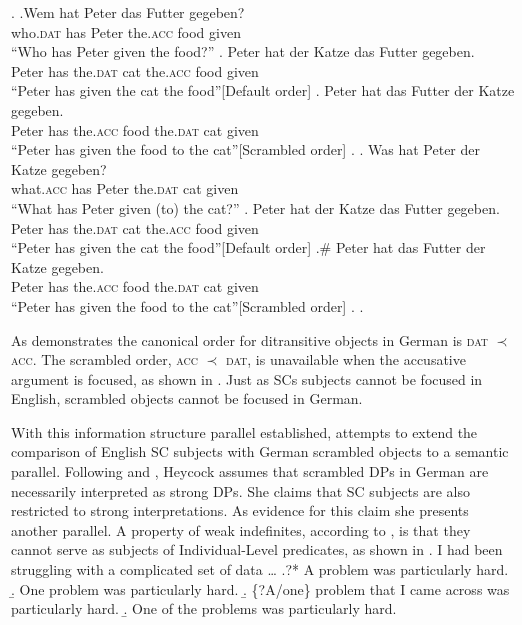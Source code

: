 \documentclass[letterpaper]{article}
\begin{document}
\ex.
\ag.Wem hat Peter das Futter gegeben?\\
who.\textsc{dat} has Peter the.\textsc{acc} food given\\
``Who has Peter given the food?''
\ag. Peter hat der Katze das Futter gegeben.\\
Peter has the.\textsc{dat} cat the.\textsc{acc} food given\\
``Peter has given the cat the food''\hfill[Default order]
\bg. Peter hat das Futter der Katze gegeben.\\
Peter has the.\textsc{acc} food the.\textsc{dat} cat given\\
``Peter has given the food to the cat''\hfill[Scrambled order]
\z.
\bg. Was hat Peter der Katze gegeben?\\
what.\textsc{acc} has Peter the.\textsc{dat} cat given\\
``What has Peter given (to) the cat?''
\ag. Peter hat der Katze das Futter gegeben.\\
Peter has the.\textsc{dat} cat the.\textsc{acc} food given\\
``Peter has given the cat the food''\hfill[Default order]
\bg.\# Peter hat das Futter der Katze gegeben.\\
Peter has the.\textsc{acc} food the.\textsc{dat} cat given\\
``Peter has given the food to the cat''\hfill[Scrambled order]
\z.
\z.

As \Last demonstrates the canonical order for ditransitive objects in German is \textsc{dat} $\prec$ \textsc{acc}.
The scrambled order, \textsc{acc} $\prec$ \textsc{dat}, is unavailable when the accusative argument is focused, as shown in \Last[b-ii]. 
Just as SCs subjects cannot be focused in English, scrambled objects cannot be focused in German.

With this information structure parallel established, \textcite{heycock2012specification} attempts to extend the comparison of English SC subjects with German scrambled objects to a semantic parallel.
Following \textcite{dehoop1992case} and \textcite{diesing1992indefinites}, Heycock assumes that scrambled DPs in German are necessarily interpreted as strong DPs.
She claims that SC subjects are also restricted to strong interpretations.
As evidence for this claim she presents another parallel.
A property of weak indefinites, according to \textcite{milsark1974existential}, is that they cannot serve as subjects of Individual-Level predicates, as shown in \Next
\ex. I had been struggling with a complicated set of data \ldots
\a.?* A problem was particularly hard.
\b. One problem was particularly hard.
\b. \{?A/one\} problem that I came across was particularly hard.
\b. One of the problems was particularly hard.\hfill\parencite{heycock2012specification}
\end{document}
